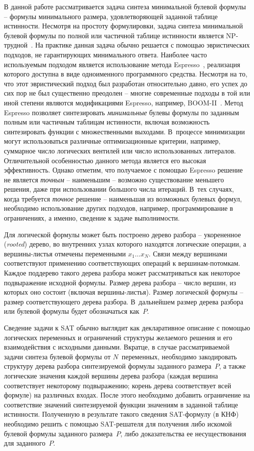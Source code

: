 В данной работе рассматривается задача синтеза минимальной булевой формулы \--- формулы минимального размера, удовлетворяющей заданной таблице истинности.
Несмотря на простоту формулировки, задача синтеза минимальной булевой формулы по полной или частичной таблице истинности является NP-трудной~\cite{akshay2018}.
На практике данная задача обычно решается с помощью эвристических подходов, не гарантирующих минимального ответа.
Наиболее часто используемым подходом является использование метода Espresso~\cite{brayton1984}, реализация которого доступна в виде одноименного программного средства.
Несмотря на то, что этот эвристический подход был разработан относительно давно, его успех до сих пор не был существенно преодолен \--- многие современные подходы в той или иной степени являются модификациями Espresso, например, BOOM-II~\cite{fiser2006}.
Метод Espresso позволяет синтезировать \emph{минимальные} булевы формулы по заданным полным или частичным таблицам истинности, включая возможность синтезировать функции с множественными выходами.
В~процессе минимизации могут использоваться различные оптимизационные критерии, например, суммарное число логических вентилей или число использованных литералов.
Отличительной особенностью данного метода является его высокая эффективность.
Однако отметим, что получаемое с помощью Espresso решение не является \emph{точным} \--- наименьшим \--- возможно существование меньшего решения, даже при использовании большого числа итераций.
В~тех случаях, когда требуется \emph{точное} решение \--- наименьшая из возможных булевых формул, необходимо использование других подходов, например, программирование в ограничениях, а именно, сведение к задаче выполнимости.

Для логической формулы может быть построено дерево разбора \--- укорененное (\textit{rooted}) дерево, во внутренних узлах которого находятся логические операции, а вершины-листья отмечены переменными $x_{1} \ldots x_{N}$.
Связи между вершинами соответствуют применению соответствующих операций к вершинам-потомкам.
Каждое поддерево такого дерева разбора может рассматриваться как некоторое подвыражение исходной формулы.
Размер дерева разбора \--- число вершин, из которых оно состоит (включая вершины-листья).
Размер логической формулы \--- размер соответствующего дерева разбора.
В~дальнейшем размер дерева разбора или булевой формулы будет обозначаться как~$P$.

Сведение задачи к SAT обычно выглядит как декларативное описание с помощью логических переменных и ограничений структуры желаемого решения и его взаимодействия с исходными данными.
Вкратце, в случае рассматриваемой задачи синтеза булевой формулы от $N$~переменных, необходимо закодировать структуру дерева разбора синтезируемой формулы заданного размера~$P$, а также логические значения каждой вершины дерева разбора (каждая вершина соответствует некоторому подвыражению; корень дерева соответствует всей формуле) на различных входах.
После этого необходимо добавить ограничение на соответствие значений синтезируемой функции значениям в заданной таблице истинности.
Полученную в результате такого сведения SAT-формулу (в КНФ) необходимо решить с помощью SAT-решателя для получения либо искомой булевой формулы заданного размера~$P$, либо доказательства ее несуществования для заданного~$P$.

